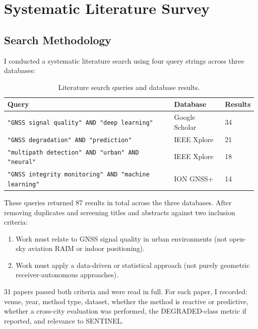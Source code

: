 \documentclass[12pt,a4paper]{article}
\begin{document}
\section{Systematic Literature Survey}

\subsection{Search Methodology}

I conducted a systematic literature search using four query strings across three databases:

\begin{table}[H]
  \centering
  \caption{Literature search queries and database results.}
  \begin{tabularx}{\textwidth}{Xll}
    \toprule
    \textbf{Query} & \textbf{Database} & \textbf{Results} \\
    \midrule
    \texttt{"GNSS signal quality" AND "deep learning"} & Google Scholar & 34 \\
    \texttt{"GNSS degradation" AND "prediction"} & IEEE Xplore & 21 \\
    \texttt{"multipath detection" AND "urban" AND "neural"} & IEEE Xplore & 18 \\
    \texttt{"GNSS integrity monitoring" AND "machine learning"} & ION GNSS+ & 14 \\
    \bottomrule
  \end{tabularx}
\end{table}

These queries returned 87 results in total across the three databases. After removing
duplicates and screening titles and abstracts against two inclusion criteria:
\begin{enumerate}
  \item Work must relate to GNSS signal quality in urban environments (not open-sky
    aviation RAIM or indoor positioning).
  \item Work must apply a data-driven or statistical approach (not purely geometric
    receiver-autonomous approaches).
\end{enumerate}

31 papers passed both criteria and were read in full.
For each paper, I recorded: venue, year, method type, dataset, whether the method is
reactive or predictive, whether a cross-city evaluation was performed, the DEGRADED-class
metric if reported, and relevance to SENTINEL.
\end{document}
